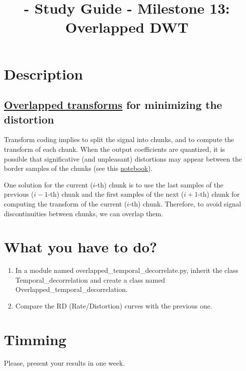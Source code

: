
\title{\TM{} - Study Guide - Milestone 13: Overlapped DWT}

\maketitle

\section{Description}

\subsection{\href{https://en.wikipedia.org/wiki/Lapped_transform}{Overlapped transforms} for minimizing the distortion}
Transform coding implies to split the signal into chunks, and to
compute the transform of each chunk. When the output coefficients are
quantized, it is possible that significative (and unpleasant)
distortions may appear between the border samples of the chunks (see
this
\href{https://github.com/Tecnologias-multimedia/intercom/blob/master/docs/quantization_DWT.ipynb}{notebook}).

One solution for the current ($i$-th) chunk is to use the last samples
of the previous ($i-1$-th) chunk and the first samples of the next
($i+1$-th) chunk for computing the transform of the current ($i$-th)
chunk. Therefore, to avoid signal discontinuities between chunks, we
can overlap them.
  
\section{What you have to do?}

\begin{enumerate}
\item In a module named overlapped\_temporal\_decorrelate.py, inherit
  the class Temporal\_decorrelation and create a class named
  Overlapped\_temporal\_decorrelation.
\item Compare the RD (Rate/Distortion) curves with the previous one.
\end{enumerate}

\section{Timming}

Please, present your results in one week.

